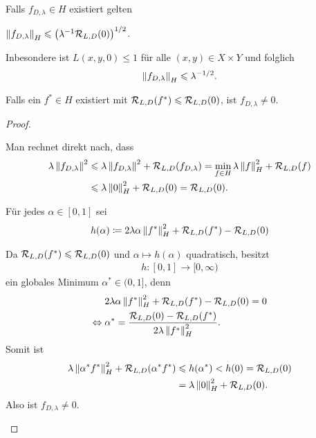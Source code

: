 \begin{lem}
\label{prop:6.1.4}
Falls $f_{D,\lambda}\in H$ existiert gelten
\begin{propenum}
\item $\left\|f_{D,\lambda}\right\|_H \leqslant \left(\lambda^{-1} \mathcal{R}_{L,D}(0)\right)^{1/2}$.

Inbesondere ist $L(x,y,0) \le 1$ für alle $(x,y)\in X\times Y$ und folglich
\begin{align*}
\left\|f_{D,\lambda}\right\|_H \leqslant \lambda^{-1/2}.
\end{align*}
\item Falls ein $f^*\in H$ existiert mit $\mathcal{R}_{L,D}(f^*) \leqslant \mathcal{R}_{L,D}(0)$, ist
$f_{D,\lambda}\neq 0$.\fishhere
\end{propenum}
\end{lem}
\begin{proof}
\begin{proofenum}
\item Man rechnet direkt nach, dass
\begin{align*}
\lambda\left\|f_{D,\lambda}\right\|^2 &\leqslant 
\lambda\left\|f_{D,\lambda}\right\|^2 + 
\mathcal{R}_{L,D}(f_{D,\lambda})
= \min_{f\in H} \lambda \left\|f\right\|_H^2 + \mathcal{R}_{L,D}(f)\\
&\leqslant \lambda \left\|0\right\|_H^2 + \mathcal{R}_{L,D}(0)
= \mathcal{R}_{L,D}(0).
\end{align*}
\item Für jedes $\alpha\in [0,1]$ sei
\begin{align*}
h(\alpha) \coloneq 2\lambda \alpha \left\|f^*\right\|_H^2 + \mathcal{R}_{L,D}(f^*)-\mathcal{R}_{L,D}(0)
\end{align*}

Da $\mathcal{R}_{L,D}(f^*)\leqslant \mathcal{R}_{L,D}(0)$ und $\alpha \mapsto h(\alpha)$ quadratisch,
besitzt
\begin{align*}
h: [0,1]\to [0,\infty)
\end{align*}
ein globales Minimum $\alpha^*\in (0,1]$, denn
\begin{align*}
&2\lambda \alpha \left\|f^*\right\|_H^2 + \mathcal{R}_{L,D}(f^*)-\mathcal{R}_{L,D}(0) = 0\\
\Leftrightarrow
\; &\alpha^* = \frac{\mathcal{R}_{L,D}(0)-\mathcal{R}_{L,D}(f^*)}{2\lambda \left\|f^*\right\|_H^2}.
\end{align*}
Somit ist
\begin{align*}
\lambda \left\|\alpha^* f^*\right\|_H^2 + \mathcal{R}_{L,D}(\alpha^*f^*)
&\leqslant h(\alpha^*) < h(0) = \mathcal{R}_{L,D}(0) \\ &
= \lambda \left\|0\right\|_H^2 +
\mathcal{R}_{L,D}(0).
\end{align*}
Also ist $f_{D,\lambda}\neq 0$.\qedhere
\end{proofenum}
\end{proof}

